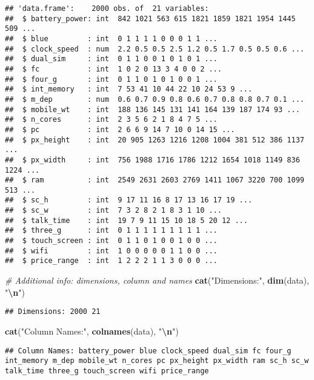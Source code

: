 \documentclass[
]{article}
\newenvironment{Shaded}{\begin{snugshade}}{\end{snugshade}}
\newcommand{\CommentTok}[1]{\textcolor[rgb]{0.56,0.35,0.01}{\textit{#1}}}
\newcommand{\FunctionTok}[1]{\textcolor[rgb]{0.13,0.29,0.53}{\textbf{#1}}}
\newcommand{\NormalTok}[1]{#1}
\newcommand{\SpecialCharTok}[1]{\textcolor[rgb]{0.81,0.36,0.00}{\textbf{#1}}}
\newcommand{\StringTok}[1]{\textcolor[rgb]{0.31,0.60,0.02}{#1}}
\begin{document}
\begin{verbatim}
## 'data.frame':    2000 obs. of  21 variables:
##  $ battery_power: int  842 1021 563 615 1821 1859 1821 1954 1445 509 ...
##  $ blue         : int  0 1 1 1 1 0 0 0 1 1 ...
##  $ clock_speed  : num  2.2 0.5 0.5 2.5 1.2 0.5 1.7 0.5 0.5 0.6 ...
##  $ dual_sim     : int  0 1 1 0 0 1 0 1 0 1 ...
##  $ fc           : int  1 0 2 0 13 3 4 0 0 2 ...
##  $ four_g       : int  0 1 1 0 1 0 1 0 0 1 ...
##  $ int_memory   : int  7 53 41 10 44 22 10 24 53 9 ...
##  $ m_dep        : num  0.6 0.7 0.9 0.8 0.6 0.7 0.8 0.8 0.7 0.1 ...
##  $ mobile_wt    : int  188 136 145 131 141 164 139 187 174 93 ...
##  $ n_cores      : int  2 3 5 6 2 1 8 4 7 5 ...
##  $ pc           : int  2 6 6 9 14 7 10 0 14 15 ...
##  $ px_height    : int  20 905 1263 1216 1208 1004 381 512 386 1137 ...
##  $ px_width     : int  756 1988 1716 1786 1212 1654 1018 1149 836 1224 ...
##  $ ram          : int  2549 2631 2603 2769 1411 1067 3220 700 1099 513 ...
##  $ sc_h         : int  9 17 11 16 8 17 13 16 17 19 ...
##  $ sc_w         : int  7 3 2 8 2 1 8 3 1 10 ...
##  $ talk_time    : int  19 7 9 11 15 10 18 5 20 12 ...
##  $ three_g      : int  0 1 1 1 1 1 1 1 1 1 ...
##  $ touch_screen : int  0 1 1 0 1 0 0 1 0 0 ...
##  $ wifi         : int  1 0 0 0 0 0 1 1 0 0 ...
##  $ price_range  : int  1 2 2 2 1 1 3 0 0 0 ...
\end{verbatim}

\begin{Shaded}
\begin{Highlighting}[]
\CommentTok{\# Additional info: dimensions, column and names}
\FunctionTok{cat}\NormalTok{(}\StringTok{"Dimensions:"}\NormalTok{, }\FunctionTok{dim}\NormalTok{(data), }\StringTok{"}\SpecialCharTok{\textbackslash{}n}\StringTok{"}\NormalTok{)}
\end{Highlighting}
\end{Shaded}

\begin{verbatim}
## Dimensions: 2000 21
\end{verbatim}

\begin{Shaded}
\begin{Highlighting}[]
\FunctionTok{cat}\NormalTok{(}\StringTok{"Column Names:"}\NormalTok{, }\FunctionTok{colnames}\NormalTok{(data), }\StringTok{"}\SpecialCharTok{\textbackslash{}n}\StringTok{"}\NormalTok{)}
\end{Highlighting}
\end{Shaded}

\begin{verbatim}
## Column Names: battery_power blue clock_speed dual_sim fc four_g int_memory m_dep mobile_wt n_cores pc px_height px_width ram sc_h sc_w talk_time three_g touch_screen wifi price_range
\end{verbatim}
\end{document}
